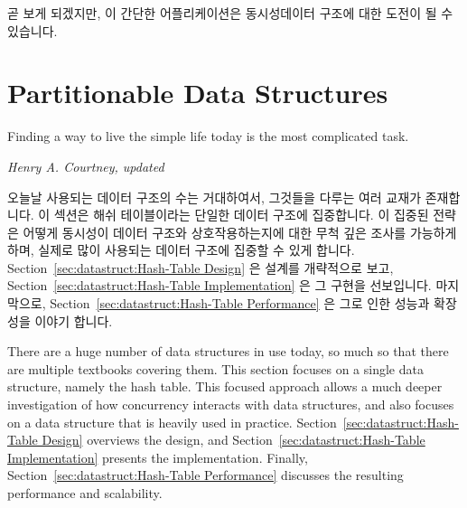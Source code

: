 곧 보게 되겠지만, 이 간단한 어플리케이션은 동시성데이터 구조에 대한 도전이 될
수 있습니다.

\section{Partitionable Data Structures}
\label{sec:datastruct:Partitionable Data Structures}
%
\epigraph{Finding a way to live the simple life today is the most
	  complicated task.}
	 {\emph{Henry A. Courtney, updated}}

오늘날 사용되는 데이터 구조의 수는 거대하여서, 그것들을 다루는 여러 교재가
존재합니다.
이 섹션은 해쉬 테이블이라는 단일한 데이터 구조에 집중합니다.
이 집중된 전략은 어떻게 동시성이 데이터 구조와 상호작용하는지에 대한 무척 깊은
조사를 가능하게 하며, 실제로 많이 사용되는 데이터 구조에 집중할 수 있게 합니다.
Section~\ref{sec:datastruct:Hash-Table Design}
은 설계를 개략적으로 보고,
Section~\ref{sec:datastruct:Hash-Table Implementation}
은 그 구현을 선보입니다.
마지막으로,
Section~\ref{sec:datastruct:Hash-Table Performance}
은 그로 인한 성능과 확장성을 이야기 합니다.

\iffalse

There are a huge number of data structures in use today, so much so
that there are multiple textbooks covering them.
This section focuses on a single data structure, namely the hash table.
This focused approach allows a much deeper investigation of how concurrency
interacts with data structures, and also focuses on a data structure
that is heavily used in practice.
Section~\ref{sec:datastruct:Hash-Table Design}
overviews the design, and
Section~\ref{sec:datastruct:Hash-Table Implementation}
presents the implementation.
Finally,
Section~\ref{sec:datastruct:Hash-Table Performance}
discusses the resulting performance and scalability.

